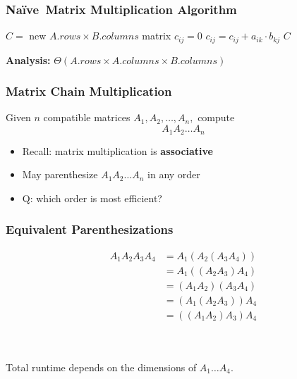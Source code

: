 \documentclass{beamer}
\newcommand{\stanza}{ \\~\ }
\newcommand{\Naive}{Na\"{i}ve~}
\begin{document}
\begin{frame} \frametitle{\Naive Matrix Multiplication Algorithm}
  {\small
  \begin{algorithmic}[1]
    \State $C = $ new $A.rows \times B.columns$ matrix
        \State $c_{ij} = 0$
          \State $c_{ij} = c_{ij} + a_{ik} \cdot b_{kj}$
        \EndFor
      \EndFor
    \EndFor
    \State \Return $C$
    \EndFunction
  \end{algorithmic}
  }
  
  \textbf{Analysis:} $\Theta(A.rows \times A.columns \times B.columns)$
\end{frame}

\begin{frame} \frametitle{Matrix Chain Multiplication}
  Given $n$ compatible matrices $A_1, A_2, \ldots, A_n,$ compute
  \[ A_1 A_2 \ldots A_n \]

  \begin{itemize}
    \item Recall: matrix multiplication is \textbf{associative}
    \item May parenthesize $ A_1 A_2 \ldots A_n $ in any order
    \item Q: which order is most efficient?
  \end{itemize}
\end{frame}

\begin{frame} \frametitle{Equivalent Parenthesizations}
 \begin{align*}
    A_1 A_2 A_3 A_4
    &= A_1 (A_2(A_3 A_4)) \\
    &= A_1 ((A_2 A_3) A_4) \\
    &= (A_1 A_2) (A_3 A_4) \\
    &= (A_1 (A_2 A_3)) A_4 \\
    &= ((A_1 A_2) A_3) A_4
  \end{align*}
\stanza

\begin{center}
  Total runtime depends on the dimensions of $A_1 \ldots A_4.$
\end{center}
\end{frame}
\end{document}
